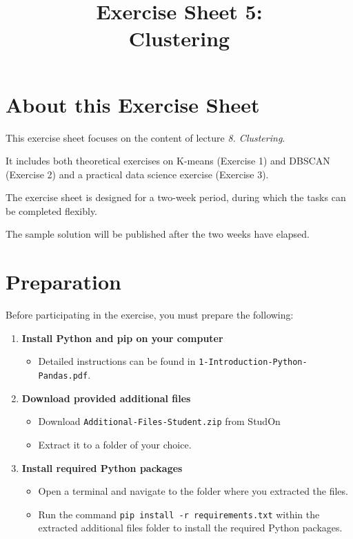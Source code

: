 \documentclass[
english,
smallborders
]{i6prcsht}
\begin{document}
\title{Exercise Sheet 5: \\ Clustering}
\maketitle
\vspace*{-2cm}

\section*{About this Exercise Sheet}

This exercise sheet focuses on the content of lecture \textit{8. Clustering}.

It includes both theoretical exercises on K-means (Exercise 1) and DBSCAN (Exercise 2) and a practical data science exercise (Exercise 3).

The exercise sheet is designed for a two-week period, during which the tasks can be completed flexibly.

The sample solution will be published after the two weeks have elapsed.

\section*{Preparation}

Before participating in the exercise, you must prepare the following:

\begin{enumerate}
	\item \textbf{Install Python and pip on your computer}
	      
	      \begin{itemize}
		      \item Detailed instructions can be found in \texttt{1-Introduction-Python-Pandas.pdf}.
	      \end{itemize}
	      
	\item \textbf{Download provided additional files}
	      
	      \begin{itemize}
		      \item Download \texttt{Additional-Files-Student.zip} from StudOn
		      \item Extract it to a folder of your choice.
	      \end{itemize}
	      
	\item \textbf{Install required Python packages}
	      
	      \begin{itemize}
		      \item Open a terminal and navigate to the folder where you extracted the files.
		      \item Run the command \texttt{pip install -r requirements.txt} within the extracted additional files folder to install the required Python packages.
	      \end{itemize}
	      
	      
\end{enumerate}
\end{document}
